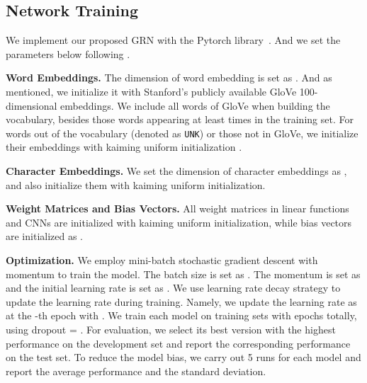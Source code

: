 \documentclass[letterpaper]{article} \usepackage{aaai19}  \usepackage{times}  \usepackage{helvet}  \usepackage{courier}  \usepackage{url}  \usepackage{graphicx}  \usepackage{amsmath}
\newcommand{\GRN}{GRN}
\begin{document}
\begin{table}[t!]
  \centering
    \begin{adjustbox}{max width=0.8\columnwidth}
    \end{adjustbox}
    \caption{Statistics of CoNLL-2003 and Ontonotes 5.0.}
    \label{tab:dataset}
\end{table}

\subsection{Network Training}
We implement our proposed \GRN{} with the Pytorch library~\cite{paszke2017automatic}. And we set the parameters below following \cite{ma2016CNNBLSTMCRF}.

\textbf{Word Embeddings.} The dimension of word embedding is set as . And as mentioned, we initialize it with Stanford's publicly available GloVe 100-dimensional embeddings. We include all words of GloVe when building the vocabulary, besides those words appearing at least  times in the training set. For words out of the vocabulary (denoted as \texttt{UNK}) or those not in GloVe, we initialize their embeddings with kaiming uniform initialization \cite{he2015delving}. 

\textbf{Character Embeddings.} We set the dimension of character embeddings as , and also initialize them with kaiming uniform initialization.

\textbf{Weight Matrices and Bias Vectors.} All weight matrices in linear functions and CNNs are initialized with kaiming uniform initialization, while bias vectors are initialized as .

\textbf{Optimization.} We employ mini-batch stochastic gradient descent with momentum to train the model. The batch size is set as . The momentum is set as  and the initial learning rate is set as . We use learning rate decay strategy to update the learning rate during training. Namely, we update the learning rate as  at the -th epoch with . We train each model on training sets with  epochs totally, using dropout = . For evaluation, we select its best version with the highest performance on the development set and report the corresponding performance on the test set. To reduce the model bias, we carry out 5 runs for each model and report the average performance and the standard deviation.
\end{document}
